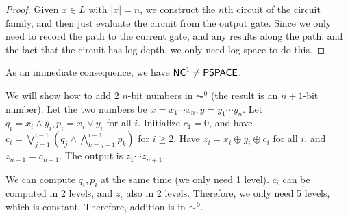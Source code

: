 \begin{proof}
Given $x \in L$ with $|x| = n$, we construct the $n$th circuit of the circuit family, and then just evaluate the circuit from the output gate. Since we only need to record the path to the current gate, and any results along the path, and the fact that the circuit has log-depth, we only need log space to do this.
\end{proof}
As an immediate consequence, we have ${\mathsf{NC}}^1 \ne {\ensuremath{\mathsf{PSPACE}}}$. 

\begin{example}
We will show how to add 2 $n$-bit numbers in $\AC^0$ (the result is an $n+1$-bit number). Let the two numbers be $x = x_1\cdots x_n, y = y_1\cdots y_n$. Let $q_i = x_i \wedge y_i, p_i = x_i \vee y_i$ for all $i$. Initialize $c_1 = 0$, and have $c_i = \bigvee_{j=1}^{i-1} (q_j \wedge \bigwedge_{k=j+1}^{i-1}p_k)$ for $i \ge 2$. Have $z_i = x_i \oplus y_i \oplus c_i$ for all $i$, and $z_{n+1} = c_{n+1}$. The output is $z_1\cdots z_{n+1}$. 

\par We can compute $q_i, p_i$ at the same time (we only need 1 level). $c_i$ can be computed in 2 levels, and $z_i$ also in 2 levels. Therefore, we only need 5 levels, which is constant. Therefore, addition is in $\AC^0$. 
\end{example}

